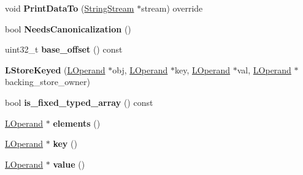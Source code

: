 \begin{DoxyCompactItemize}
\item 
void {\bfseries Print\+Data\+To} (\hyperlink{classv8_1_1internal_1_1_string_stream}{String\+Stream} $\ast$stream) override\hypertarget{classv8_1_1internal_1_1_l_store_keyed_a6904d9c0c8c7e81ec9aab35f73978d38}{}\label{classv8_1_1internal_1_1_l_store_keyed_a6904d9c0c8c7e81ec9aab35f73978d38}

\item 
bool {\bfseries Needs\+Canonicalization} ()\hypertarget{classv8_1_1internal_1_1_l_store_keyed_a638212d8d0abef68447e1451b452ac14}{}\label{classv8_1_1internal_1_1_l_store_keyed_a638212d8d0abef68447e1451b452ac14}

\item 
uint32\+\_\+t {\bfseries base\+\_\+offset} () const \hypertarget{classv8_1_1internal_1_1_l_store_keyed_aa88021608606f53948b262edeccda1e6}{}\label{classv8_1_1internal_1_1_l_store_keyed_aa88021608606f53948b262edeccda1e6}

\item 
{\bfseries L\+Store\+Keyed} (\hyperlink{classv8_1_1internal_1_1_l_operand}{L\+Operand} $\ast$obj, \hyperlink{classv8_1_1internal_1_1_l_operand}{L\+Operand} $\ast$key, \hyperlink{classv8_1_1internal_1_1_l_operand}{L\+Operand} $\ast$val, \hyperlink{classv8_1_1internal_1_1_l_operand}{L\+Operand} $\ast$backing\+\_\+store\+\_\+owner)\hypertarget{classv8_1_1internal_1_1_l_store_keyed_af5f464336aea00a44cba982466a6fa1b}{}\label{classv8_1_1internal_1_1_l_store_keyed_af5f464336aea00a44cba982466a6fa1b}

\item 
bool {\bfseries is\+\_\+fixed\+\_\+typed\+\_\+array} () const \hypertarget{classv8_1_1internal_1_1_l_store_keyed_a9e741b26eae820e0effc84187cef9fd1}{}\label{classv8_1_1internal_1_1_l_store_keyed_a9e741b26eae820e0effc84187cef9fd1}

\item 
\hyperlink{classv8_1_1internal_1_1_l_operand}{L\+Operand} $\ast$ {\bfseries elements} ()\hypertarget{classv8_1_1internal_1_1_l_store_keyed_a65b49dc68849be2f341b9f6db3399248}{}\label{classv8_1_1internal_1_1_l_store_keyed_a65b49dc68849be2f341b9f6db3399248}

\item 
\hyperlink{classv8_1_1internal_1_1_l_operand}{L\+Operand} $\ast$ {\bfseries key} ()\hypertarget{classv8_1_1internal_1_1_l_store_keyed_a768f44140c1abab8ec345ef73cb417ea}{}\label{classv8_1_1internal_1_1_l_store_keyed_a768f44140c1abab8ec345ef73cb417ea}

\item 
\hyperlink{classv8_1_1internal_1_1_l_operand}{L\+Operand} $\ast$ {\bfseries value} ()\hypertarget{classv8_1_1internal_1_1_l_store_keyed_a6a97e536a0eed02971eb915a57b6e898}{}\label{classv8_1_1internal_1_1_l_store_keyed_a6a97e536a0eed02971eb915a57b6e898}


\end{DoxyCompactItemize}
